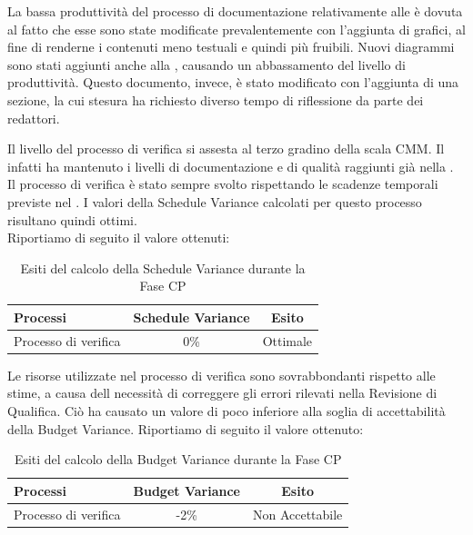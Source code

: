 La bassa produttività del processo di documentazione relativamente alle  è dovuta al fatto che esse sono state modificate prevalentemente con l'aggiunta di grafici, al fine di renderne i contenuti meno testuali e quindi più fruibili. Nuovi diagrammi sono stati aggiunti anche alla , causando un abbassamento del livello di produttività. Questo documento, invece, è stato modificato con l'aggiunta di una sezione, la cui stesura ha richiesto diverso tempo di riflessione da parte dei redattori.

	Il livello del processo di verifica si assesta al terzo gradino della scala CMM. Il \groupname{} infatti ha mantenuto i livelli di documentazione e di qualità raggiunti già nella .
	Il processo di verifica è stato sempre svolto rispettando le scadenze temporali previste nel . I valori della Schedule Variance calcolati per questo processo risultano quindi ottimi.\\
			Riportiamo di seguito il valore ottenuti:
			\begin{table}[H]
				\centering
				\begin{tabu}{| l | c | c |}
					\hline
						Processi 							& Schedule Variance	& Esito		\\ \hline \hline
						Processo di verifica & 0\% & Ottimale \\ \hline
				\end{tabu}
				\caption{Esiti del calcolo della Schedule Variance durante la Fase CP}
			\end{table}	

Le risorse utilizzate nel processo di verifica sono sovrabbondanti rispetto alle stime, a causa dell necessità di correggere gli errori rilevati nella Revisione di Qualifica. Ciò ha causato un valore di poco inferiore alla soglia di accettabilità della Budget Variance.
Riportiamo di seguito il valore ottenuto:
\begin{table}[H]
	\centering
	\begin{tabu}{| l | c | c |}
	\hline
	Processi 							& Budget Variance	& Esito		\\ \hline \hline
	Processo di verifica & -2\% & Non Accettabile \\ \hline
	\end{tabu}
	\caption{Esiti del calcolo della Budget Variance durante la Fase CP}
\end{table}	

